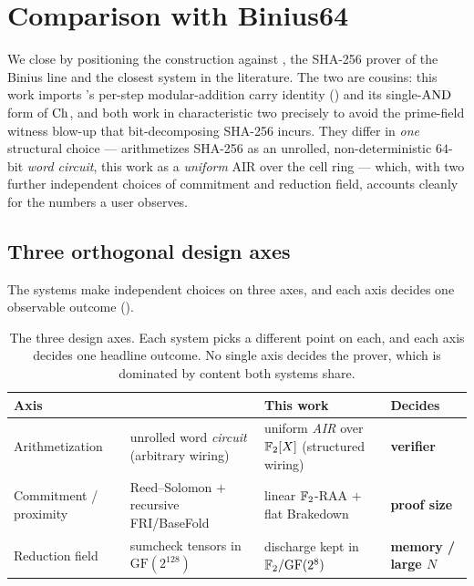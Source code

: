 \section{Comparison with Binius64}
\label{sec:cmp}

We close by positioning the construction against \binius{} \cite{binius64repo},
the SHA-256 prover of the Binius line \cite{binius,fribinius} and the closest
system in the literature. The two are cousins: this work imports \binius{}'s
per-step modular-addition carry identity () and its single-$\operatorname{AND}$
form of $\operatorname{Ch}$, and both work in characteristic two precisely to avoid the
prime-field witness blow-up that bit-decomposing SHA-256 incurs. They differ in
\emph{one} structural choice --- \binius{} arithmetizes SHA-256 as an unrolled,
non-deterministic $64$-bit \emph{word circuit}, this work as a \emph{uniform} AIR
over the cell ring --- which, with two further independent choices of commitment
and reduction field, accounts cleanly for the numbers a user observes.

\subsection{Three orthogonal design axes}
\label{sec:axes}

The systems make independent choices on three axes, and each axis decides one
observable outcome ().

\begin{table}[h]
\centering
\renewcommand{\arraystretch}{1.25}
\begin{tabularx}{\textwidth}{@{}lXXl@{}}
\toprule
\textbf{Axis} & \textbf{\binius{}} & \textbf{This work} & \textbf{Decides} \\
\midrule
Arithmetization &
  unrolled word \emph{circuit} (arbitrary wiring) &
  uniform \emph{AIR} over $\mathbb{F}_2[X]$ (structured wiring) &
  \textbf{verifier} \\
Commitment / proximity &
  Reed--Solomon $+$ recursive FRI/BaseFold &
  linear $\mathbb{F}_2$-RAA $+$ flat Brakedown &
  \textbf{proof size} \\
Reduction field &
  sumcheck tensors in $\mathrm{GF}(2^{128})$ &
  discharge kept in $\mathbb{F}_2/\mathrm{GF}(2^8)$ &
  \textbf{memory / large $N$} \\
\bottomrule
\end{tabularx}
\caption{The three design axes. Each system picks a different point on each, and
each axis decides one headline outcome. No single axis decides the prover, which
is dominated by content both systems share.}
\label{tab:axes}
\end{table}

